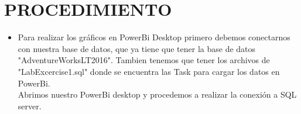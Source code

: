 \section{PROCEDIMIENTO} 

\begin{itemize}
\subsection{Ejercicio 1: Conectando a Power BI a datos}
	\subsubsection{Parte 1: Conectar a datos existentes }

		\item Para realizar los gráficos en PowerBi Desktop primero debemos conectarnos con nuestra base de datos, que ya tiene que tener la base de datos "AdventureWorksLT2016".  Tambien tenemos que tener los archivos de "LabExcercise1.sql" donde se encuentra las Task para cargar los datos en PowerBi. \\Abrimos nuestro PowerBi desktop y procedemos a realizar la conexión a SQL server.
		\begin{figure}[h]
		\begin{center}
		\end{center}
		\end{figure}
		\begin{figure}[h]
		\begin{center}
		\end{center}
		\end{figure}
		

\end{itemize}
